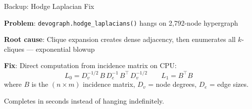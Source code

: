 \documentclass[aspectratio=169,11pt]{beamer}
\begin{document}
\begin{frame}{Backup: Hodge Laplacian Fix}

\textbf{Problem}: \texttt{devograph.hodge\_laplacians()} hangs on 2{,}792-node hypergraph

\vspace{0.3em}
\textbf{Root cause}: Clique expansion creates dense adjacency, then enumerates all $k$-cliques --- exponential blowup

\vspace{0.3em}
\textbf{Fix}: Direct computation from incidence matrix on CPU:
\[
L_0 = D_v^{-1/2} \, B \, D_e^{-1} \, B^\top \, D_v^{-1/2}
\qquad
L_1 = B^\top B
\]
where $B$ is the $(n \times m)$ incidence matrix, $D_v$ = node degrees, $D_e$ = edge sizes.

\vspace{0.3em}
Completes in seconds instead of hanging indefinitely.

\end{frame}
\end{document}
